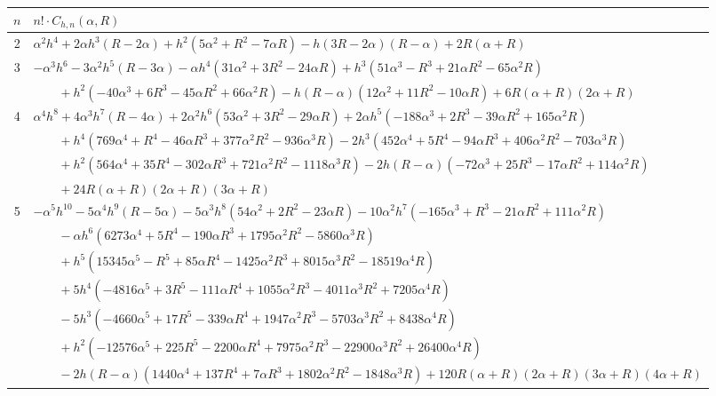 \documentclass[12pt,reqno]{article}
\numberwithin{sfootnote}{section}
\newcommand{\tabletopstrut}[0]{\rule{0pt}{3ex}}
\numberwithin{equation}{section}
\theoremstyle{DefaultTheoremStyle}
\theoremstyle{definition}
\begin{document}
\begin{table}[h]
\begin{subtable}{\textwidth}
\begin{tabular}{|c|l|} 
\hline\tabletopstrut 
$n$ & $n! \cdot C_{h,n}(\alpha, R)$ \\ \hline 
2 & $\alpha ^2 h^4+2 \alpha  h^3 (R-2 \alpha )+h^2 \left(5 \alpha ^2+R^2-7 
     \alpha  R\right)-h (3 R-2 \alpha ) (R-\alpha )+2 R (\alpha +R)$ \\ 
3 & $-\alpha ^3 h^6-3 \alpha ^2 h^5 (R-3 \alpha )-\alpha  h^4 \left(31 
     \alpha ^2+3 R^2-24 \alpha  R\right)+h^3 \left(51 \alpha ^3-R^3+21 
     \alpha  R^2-65 \alpha ^2 R\right)$ \\ 
  & $\qquad + 
     h^2 \left(-40 \alpha ^3+6 R^3-45 
     \alpha  R^2+66 \alpha ^2 R\right)-h (R-\alpha ) \left(12 \alpha ^2+11 
     R^2-10 \alpha R\right)+6 R (\alpha +R) (2 \alpha +R)$ \\ 
4 & $\alpha ^4 h^8+4 \alpha ^3 h^7 (R-4 \alpha )+2 \alpha ^2 h^6 
     \left(53 \alpha ^2+3 R^2-29 \alpha  R\right)+2 \alpha  h^5 
     \left(-188 \alpha ^3+2 R^3-39 \alpha  R^2+165 \alpha ^2 R\right)$ \\ 
  & $\qquad + 
     h^4 \left(769 \alpha ^4+R^4-46 \alpha R^3+377 \alpha ^2 R^2-936 
     \alpha ^3 R\right)-2 h^3 \left(452 \alpha ^4+5 R^4-94 \alpha  R^3+406 
     \alpha ^2 R^2-703 \alpha ^3 R\right)$ \\ 
  & $\qquad + 
     h^2 \left(564 \alpha ^4+35 R^4-302 \alpha R^3+721 \alpha ^2 R^2- 
     1118 \alpha ^3 R\right)-2 h (R-\alpha ) \left(-72 \alpha ^3+25 R^3-17 
     \alpha  R^2+114 \alpha ^2 R\right)$ \\ 
  & $\qquad + 
     24 R (\alpha +R) (2 \alpha +R) (3 \alpha +R)$ \\ 
5 & $-\alpha ^5 h^{10}-5 \alpha ^4 h^9 (R-5 \alpha )-5 \alpha ^3 h^8 
     \left(54 \alpha ^2+2 R^2-23 \alpha  R\right)-10 \alpha ^2 h^7 
     \left(-165 \alpha ^3+R^3-21 \alpha  R^2+111 \alpha ^2 R\right)$ \\ 
  & $\qquad - 
     \alpha  h^6 \left(6273 \alpha ^4+5 R^4-190 \alpha  R^3+1795 
     \alpha ^2 R^2-5860 \alpha ^3 R\right)$ \\ 
  & $\qquad + 
     h^5 \left(15345 \alpha ^5-R^5+85 \alpha  R^4-1425 \alpha ^2 R^3+ 
     8015 \alpha ^3 R^2-18519 \alpha ^4 R\right)$ \\ 
  & $\qquad + 
     5 h^4 \left(-4816 \alpha ^5+3 R^5-111 \alpha  R^4+1055 \alpha ^2 R^3- 
     4011 \alpha ^3 R^2+7205 \alpha ^4 R\right)$ \\ 
  & $\qquad - 
     5 h^3 \left(-4660 \alpha ^5+17 R^5-339 \alpha  R^4+1947 \alpha ^2 R^3- 
     5703 \alpha ^3 R^2+8438 \alpha ^4 R\right)$ \\ 
  & $\qquad + 
     h^2 \left(-12576 \alpha ^5+225 R^5-2200 \alpha  R^4+ 
     7975 \alpha ^2 R^3-22900 \alpha ^3 R^2+26400 \alpha ^4 R\right)$ \\ 
  & $\qquad - 
     2 h (R-\alpha ) \left(1440 \alpha ^4+137 R^4+7 \alpha  R^3+1802 \alpha ^2 R^2-1848 \alpha ^3 R\right)+120 R (\alpha +R) (2 \alpha +R) (3 \alpha +R) (4 \alpha +R)$ \\ \hline 
\hline 
\end{tabular} 


\end{subtable}
\end{table}
\end{document}
